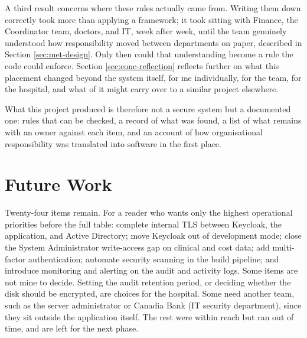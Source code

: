 A third result concerns where these rules actually came from. Writing them down correctly took more than applying a framework; it took sitting with Finance, the Coordinator team, doctors, and IT, week after week, until the team genuinely understood how responsibility moved between departments on paper, described in Section \ref{sec:met-design}. Only then could that understanding become a rule the code could enforce. Section \ref{sec:conc-reflection} reflects further on what this placement changed beyond the system itself, for me individually, for the team, for the hospital, and what of it might carry over to a similar project elsewhere.

What this project produced is therefore not a secure system but a documented one: rules that can be checked, a record of what was found, a list of what remains with an owner against each item, and an account of how organisational responsibility was translated into software in the first place.

\section{Future Work}
\label{sec:conc-future}

Twenty-four items remain. For a reader who wants only the highest operational priorities before the full table: complete internal TLS between Keycloak, the application, and Active Directory; move Keycloak out of development mode; close the System Administrator write-access gap on clinical and cost data; add multi-factor authentication; automate security scanning in the build pipeline; and introduce monitoring and alerting on the audit and activity logs. Some items are not mine to decide. Setting the audit retention period, or deciding whether the disk should be encrypted, are choices for the hospital. Some need another team, such as the server administrator or Canadia Bank (IT security department), since they sit outside the application itself. The rest were within reach but ran out of time, and are left for the next phase.

